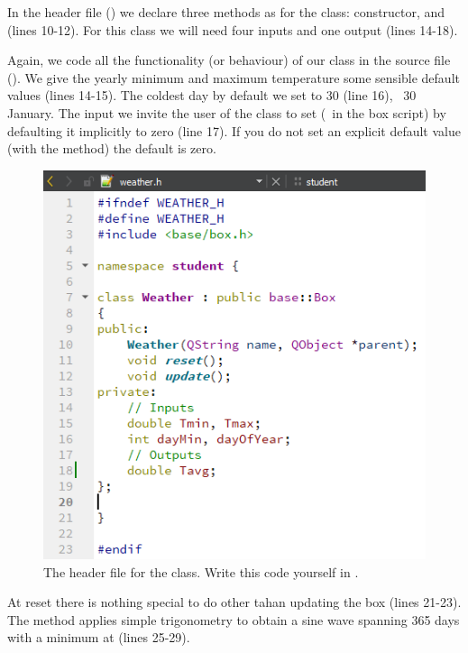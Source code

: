 In the header file () we declare three methods as for the  class: constructor,  and  (lines 10-12). For this class we will need four inputs and one output (lines 14-18).

Again, we code all the functionality (or behaviour) of our class in the source file (). We give the yearly minimum and maximum temperature some sensible default values (lines 14-15). The coldest day by default we set to 30 (line 16), \ie\ 30 January. The  input we invite the user of the class to set (\ie\ in the box script) by defaulting it implicitly to zero (line 17). If you do not set an explicit default value (with the  method) the default is zero. 

\begin{figure}
\centering
\includegraphics[scale=0.7]{graphics/qt-creator-weather-h}
\caption{The header file for the  class. Write this code yourself in .}
\label{fig:qt-creator-weather-h}
\end{figure}

At reset there is nothing special to do other tahan updating the box (lines 21-23). The  method applies simple trigonometry to obtain a sine wave spanning 365 days with a minimum at  (lines 25-29).

